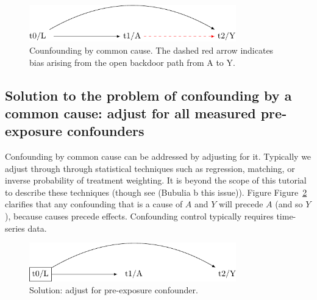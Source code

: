 \documentclass[
  singlecolumn]{report}
\begin{document}
\begin{figure}

{\centering \includegraphics[width=0.8\textwidth,height=\textheight]{causal-dags_files/figure-pdf/fig-dag-common-cause-1.pdf}

}

\caption{\label{fig-dag-common-cause}Counfounding by common cause. The
dashed red arrow indicates bias arising from the open backdoor path from
A to Y.}

\end{figure}

\hypertarget{solution-to-the-problem-of-confounding-by-a-common-cause-adjust-for-all-measured-pre-exposure-confounders}{%
\subsection{Solution to the problem of confounding by a common cause:
adjust for all measured pre-exposure
confounders}\label{solution-to-the-problem-of-confounding-by-a-common-cause-adjust-for-all-measured-pre-exposure-confounders}}

Confounding by common cause can be addressed by adjusting for it.
Typically we adjust through through statistical techniques such as
regression, matching, or inverse probability of treatment weighting. It
is beyond the scope of this tutorial to describe these techniques
(though see (Bubulia b this issue)). Figure
Figure~\ref{fig-dag-common-cause-solution} clarifies that any
confounding that is a cause of \(A\) and \(Y\) will precede \(A\) (and
so \(Y\)), because causes precede effects. Confounding control typically
requires time-series data.

\begin{figure}

{\centering \includegraphics[width=0.8\textwidth,height=\textheight]{causal-dags_files/figure-pdf/fig-dag-common-cause-solution-1.pdf}

}

\caption{\label{fig-dag-common-cause-solution}Solution: adjust for
pre-exposure confounder.}

\end{figure}
\end{document}
